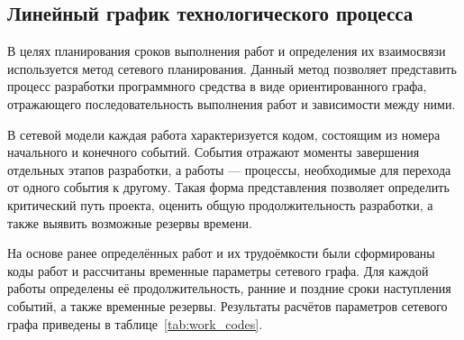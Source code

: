 \subsection{Линейный график технологического процесса}

В целях планирования сроков выполнения работ и определения их взаимосвязи используется метод сетевого планирования. Данный метод позволяет представить процесс разработки программного средства в виде ориентированного графа, отражающего последовательность выполнения работ и зависимости между ними.

В сетевой модели каждая работа характеризуется кодом, состоящим из номера начального и конечного событий. События отражают моменты завершения отдельных этапов разработки, а работы — процессы, необходимые для перехода от одного события к другому. Такая форма представления позволяет определить критический путь проекта, оценить общую продолжительность разработки, а также выявить возможные резервы времени.

На основе ранее определённых работ и их трудоёмкости были сформированы коды работ и рассчитаны временные параметры сетевого графа. Для каждой работы определены её продолжительность, ранние и поздние сроки наступления событий, а также временные резервы. Результаты расчётов параметров сетевого графа приведены в таблице~\ref{tab:work_codes}.


